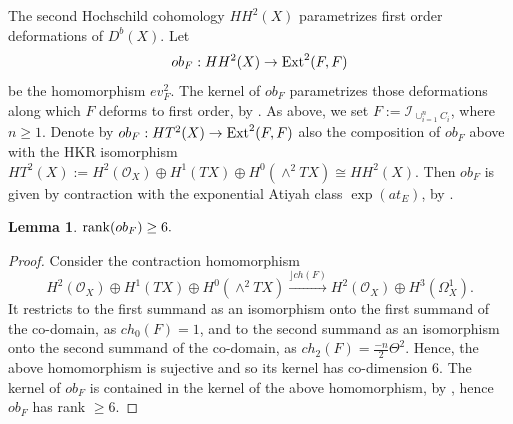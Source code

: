 \documentclass[12pt]{amsart}
\numberwithin{equation}{subsection}
\theoremstyle{plain}
\newtheorem{lem}[thm]{Lemma}
\theoremstyle{definition}
\newcommand{\LongRightArrowOf}[1]{\stackrel{#1}{\longrightarrow}}
\newcommand{\StructureSheaf}[1]{{\mathcal O}_{#1}}
\newcommand{\rank}{{\rm rank}}
\newcommand{\Ext}{{\rm Ext}}
\newcommand{\Ideal}[1]{{\mathcal I}_{#1}}
\newcommand{\Contract}{\rfloor}
\begin{document}
The second Hochschild cohomology $HH^2(X)$ parametrizes first order deformations of $D^b(X)$.
Let 
\[
ob_F: HH^2(X)\rightarrow \Ext^2(F,F)
\]
be the homomorphism $ev_F^2$. 
The kernel of $ob_F$  parametrizes those deformations along which $F$ deforms to first order, by \cite{toda}. As above, we set $F:=\Ideal{\cup_{i=1}^n C_i}$, where $n\geq 1$. Denote by $ob_F:HT^2(X)\rightarrow \Ext^2(F,F)$ also the composition of $ob_F$ above with the HKR isomorphism $HT^2(X):=H^2(\StructureSheaf{X})\oplus H^1(TX)\oplus H^0(\wedge^2TX)\cong HH^2(X)$. Then $ob_F$ is given by contraction with the exponential Atiyah class $\exp(at_E)$, by \cite[Th. A]{Huang}.


\begin{lem}
\label{lemma-rank-of-ob-F-is-at-least-6}
$\rank(ob_F)\geq 6.$
\end{lem}

\begin{proof}
Consider the contraction homomorphism
\[
H^2(\StructureSheaf{X})\oplus H^1(TX)\oplus H^0(\wedge^2TX)
\LongRightArrowOf{\Contract ch(F)}
H^2(\StructureSheaf{X})\oplus H^3(\Omega^1_X).
\]
It restricts to the first summand as an isomorphism onto the first summand of the co-domain, as $ch_0(F)=1$, and to 
the second summand as an isomorphism onto the second summand of the co-domain, as $ch_2(F)=\frac{-n}{2}\Theta^2$.
Hence, the above homomorphism is sujective and so its kernel has co-dimension $6$. The kernel of $ob_F$ is contained in the kernel of the above homomorphism, by \cite[Theorem B]{Huang}, hence $ob_F$ has rank $\geq 6$.
\end{proof}
\end{document}
